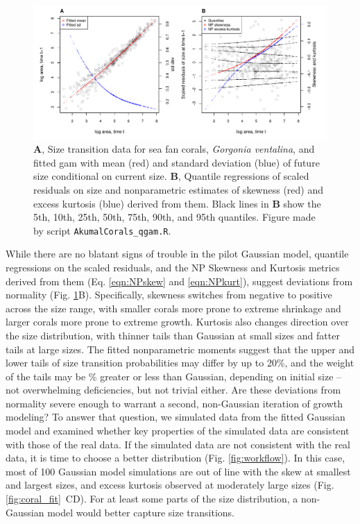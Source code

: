 \documentclass[12pt]{article}
\begin{document}
\begin{spacing}{1.35}
\begin{figure}[tbp]
	\centering
	\includegraphics[width=1.0\textwidth]{figures/coral_qgam_diagnostics.pdf}
	\caption{\textbf{A}, Size transition data for sea fan corals, \emph{Gorgonia ventalina}, and fitted gam with mean (red) and standard deviation (blue) of future size conditional on current size.  \textbf{B}, Quantile regressions of scaled residuals on size and nonparametric estimates of skewness (red) and excess kurtosis (blue) derived from them. Black lines in \textbf{B} show the 5th, 10th, 25th, 50th, 75th, 90th, and 95th quantiles. Figure made by script \texttt{AkumalCorals\_qgam.R}.}
	\label{fig:coral_diagnostics}
\end{figure} 

While there are no blatant signs of trouble in the pilot Gaussian model, quantile regressions on the scaled residuals, and the NP Skewness and Kurtosis metrics derived from them (Eq. \ref{eqn:NPskew} and \ref{eqn:NPkurt}), suggest deviations from normality (Fig. \ref{fig:coral_diagnostics}B).
Specifically, skewness switches from negative to positive across the size range, with smaller corals more prone to extreme shrinkage and larger corals more prone to extreme growth.  
Kurtosis also changes direction over the size distribution, with thinner tails than Gaussian at small sizes and fatter tails at large sizes. 
The fitted nonparametric moments suggest that the upper and lower tails of size transition probabilities may differ by up to 20\%, and the weight of the tails may be \% greater or less than Gaussian, depending on initial size -- not overwhelming deficiencies, but not trivial either. 
Are these deviations from normality severe enough to warrant a second, non-Gaussian iteration of growth modeling? 
To answer that question, we simulated data from the fitted Gaussian model and examined whether key properties of the simulated data are consistent with those of the real data. 
If the simulated data are not consistent with the real data, it is time to choose a better distribution (Fig. \ref{fig:workflow}). 
In this case, most of 100 Gaussian model simulations are out of line with the skew at smallest and largest sizes, and excess kurtosis observed at moderately large sizes (Fig. \ref{fig:coral_fit}~CD). For at least some parts of the size distribution, a non-Gaussian model would better capture size transitions. 


\end{spacing}
\end{document}
